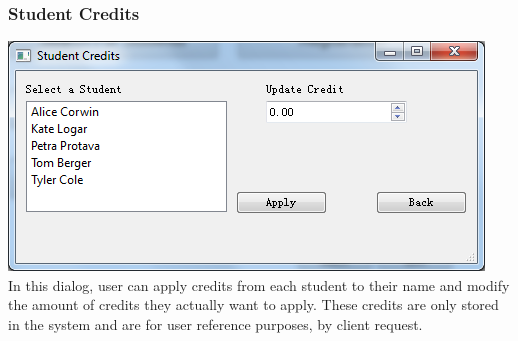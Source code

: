 \subsubsection{Student Credits}
\includegraphics[scale=0.5]{pics/student_credits.png}\\
In this dialog, user can apply credits from each student to their name and modify the amount of credits they actually want to apply. These credits are only stored in the system and are for user reference purposes, by client request.

